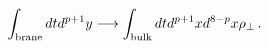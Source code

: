 \begin{equation}\label{branedensity}
\int_{{\rm{brane}}} dt d^{p+1}y \longrightarrow \int_{{\rm{bulk}}}
dt d^{p+1}x d^{8-p}x \rho_{\perp} \, .
\end{equation}

